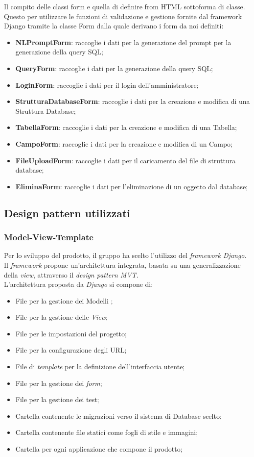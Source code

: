 \documentclass[5pt]{article}
\begin{document}
	Il compito delle classi form e quella di definire from HTML sottoforma di classe. Questo per utilizzare le funzioni di validazione e gestione fornite dal framework Django tramite la classe Form dalla quale derivano i form da noi definiti:
	\begin{itemize}
		\item \textbf{NLPromptForm}: raccoglie i dati per la generazione del prompt per la generazione della query SQL;
		\item \textbf{QueryForm}: raccoglie i dati per la generazione della query SQL;
		\item \textbf{LoginForm}: raccoglie i dati per il login dell'amministratore;
		\item \textbf{StrutturaDatabaseForm}: raccoglie i dati per la creazione e modifica di una Struttura Database;
		\item \textbf{TabellaForm}: raccoglie i dati per la creazione e modifica di una Tabella;
		\item \textbf{CampoForm}: raccoglie i dati per la creazione e modifica di un Campo;
		\item \textbf{FileUploadForm}: raccoglie i dati per il caricamento del file di struttura database;
		\item \textbf{EliminaForm}: raccoglie i dati per l'eliminazione di un oggetto dal database;
	\end{itemize}
	
	\subsection{Design pattern utilizzati}
			\subsubsection{Model-View-Template}
			Per lo sviluppo del prodotto, il gruppo ha scelto l'utilizzo del \textit{framework Django}. Il \textit{framework} propone un'architettura integrata,
			basata su una generalizzazione della \textit{view}, attraverso il \textit{design pattern MVT}. \\
			L'architettura proposta da \textit{Django} si compone di:
			\begin{itemize}
			\item File per la gestione dei Modelli ;
			\item File per la gestione delle \textit{View};
			\item File per le impostazioni del progetto;
			\item File per la configurazione degli URL;
			\item File di \textit{template} per la definizione dell'interfaccia utente;
			\item File per la gestione dei \textit{form}; 
			\item File per la gestione dei test;
			\item Cartella contenente le migrazioni verso il sistema di Database scelto;
			\item Cartella contenente file statici come fogli di stile e immagini;
			\item Cartella per ogni applicazione che compone il prodotto;
			\end{itemize}
\end{document}
